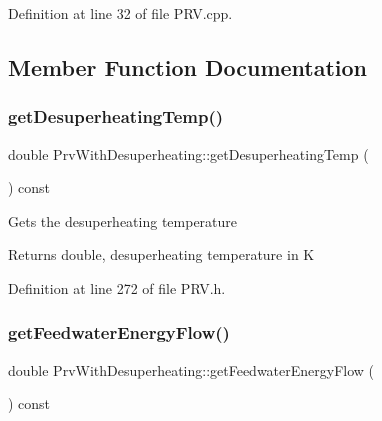 Definition at line 32 of file P\+R\+V.\+cpp.



\subsection{Member Function Documentation}
\mbox{\label{class_prv_with_desuperheating_af334a9ff9a14d110cb2851a76d5d84fb}} 
\subsubsection{\texorpdfstring{get\+Desuperheating\+Temp()}{getDesuperheatingTemp()}}
{\footnotesize\ttfamily double Prv\+With\+Desuperheating\+::get\+Desuperheating\+Temp (\begin{DoxyParamCaption}{ }\end{DoxyParamCaption}) const\hspace{0.3cm}{\ttfamily [inline]}}

Gets the desuperheating temperature

\begin{DoxyReturn}{Returns}
double, desuperheating temperature in K 
\end{DoxyReturn}


Definition at line 272 of file P\+R\+V.\+h.

\mbox{\label{class_prv_with_desuperheating_a42945a77fcdbaf1e1844c444c696f8b0}} 
\subsubsection{\texorpdfstring{get\+Feedwater\+Energy\+Flow()}{getFeedwaterEnergyFlow()}}
{\footnotesize\ttfamily double Prv\+With\+Desuperheating\+::get\+Feedwater\+Energy\+Flow (\begin{DoxyParamCaption}{ }\end{DoxyParamCaption}) const\hspace{0.3cm}{\ttfamily [inline]}}

